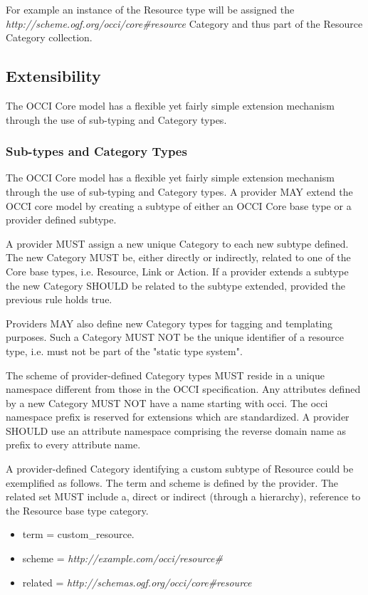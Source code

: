 \documentclass[10pt,a4paper]{article}
\begin{document}
For example an instance of the Resource type will be assigned the
\textit{http://scheme.ogf.org/occi/core\#resource} Category and thus
part of the Resource Category collection.

\subsection{Extensibility}
The OCCI Core model has a flexible yet fairly simple extension
mechanism through the use of sub-typing and Category types.

\subsubsection{Sub-types and Category Types}
The OCCI Core model has a flexible yet fairly simple extension
mechanism through the use of sub-typing and Category types.  A
provider MAY extend the OCCI core model by creating a subtype of
either an OCCI Core base type or a provider defined subtype.

A provider MUST assign a new unique Category to each new subtype
defined. The new Category MUST be, either directly or indirectly,
related to one of the Core base types, i.e. Resource, Link or
Action. If a provider extends a subtype the new Category SHOULD be
related to the subtype extended, provided the previous rule holds
true.

Providers MAY also define new Category types for tagging and
templating purposes. Such a Category MUST NOT be the unique identifier
of a resource type, i.e. must not be part of the "static type system".

The scheme of provider-defined Category types MUST reside in a unique
namespace different from those in the OCCI specification. Any
attributes defined by a new Category MUST NOT have a name starting
with occi. The occi namespace prefix is reserved for extensions which
are standardized. A provider SHOULD use an attribute namespace
comprising the reverse domain name as prefix to every attribute name.

A provider-defined Category identifying a custom subtype of Resource
could be exemplified as follows. The term and scheme is defined by the
provider. The related set MUST include a, direct or indirect (through
a hierarchy), reference to the Resource base type category.

\begin{itemize}
\item term = custom\_resource.
\item scheme = \textit{http://example.com/occi/resource\#}
\item related = \textit{http://schemas.ogf.org/occi/core\#resource}
\end{itemize}
\end{document}
